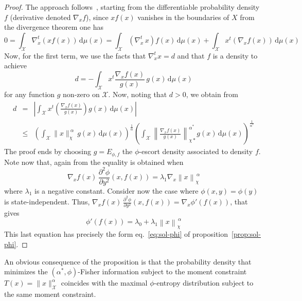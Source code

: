 \documentclass[entropy,article,submit,moreauthors,pdftex]{Definitions/mdpi}
\newcommand{\SZ}[1]{{\color{blue} #1}}                                       %
\def\dmu{\mathrm{d}\mu}%
\def\X{\mathcal{X}}%
\begin{document}
\begin{proof}
  The   approach   follows~\cite{Ber13},   starting  from   the   differentiable
  probability  density $f$  (derivative denoted  $\nabla_x f$),  since $x  f(x)$
  vanishes in the boundaries of $X$ from the divergence theorem one has
  \[
  0  = \int_\X  \nabla_x^t \left(  x f(x)  \right) \,  \dmu(x) =  \int_\X \left(
  \nabla_x^t \,  x \right) f(x)  \, \dmu(x) +  \int_\X x^t \left(  \nabla_x f(x)
  \right) \, \dmu(x)
  \]
  Now, for  the first term, we  use the facts  that \SZ{$\nabla_x^t x =  d$} and
  that $f$ is a density to achieve
  \[
  d = - \int_\X x^t \frac{\nabla_x f(x)}{g(x)} \, g(x) \, \dmu(x)
  \]
  for any function  $g$ non-zero on $\X$.   Now, noting that $d >  0$, we obtain
  from \cite[Lemma~2]{Ber13}
  \begin{eqnarray*}
  d  & = & \left|  \int_\X x^t  \left(  \frac{\nabla_x f(x)}{g(x)}  \right) g(x)  \,
  \dmu(x) \right|
  \\[2.5mm]
  & \le &  \left( \int_\X \|x\|_\chi^{\: \alpha} \,  g(x) \, \dmu(x)
  \right)^{\frac{1}{\alpha}}     \left(    \int_\X     \left\|    \frac{\nabla_x
    f(x)}{g(x)}\right\|_{\chi*}^{\alpha^*}        g(x)         \,        \dmu(x)
  \right)^{\frac{1}{\alpha^*}}
  \end{eqnarray*}
  The  proof  ends  by  choosing  $g =  E_{\phi,f}$  the  $\phi$-escort  density
  associated to density $f$. Note now that, again from \cite[Lemma~2]{Ber13} the
  equality is obtained when
  \[
  \nabla_x  f(x) \,  \frac{\partial^2 \phi}{\partial  y^2} (x,f(x))  = \lambda_1
  \nabla_x \left\| x \right\|_\chi^{\, \alpha}
  \]
  where  $\lambda_1$  is a  negative  constant.   Consider  now the  case  where
  $\phi(x,y)  =   \phi(y)$  is  state-independent.   Thus,   $\nabla_x  f(x)  \,
  \frac{\partial^2 \phi}{\partial  y^2} (x,f(x))  = \nabla_x  \phi'(f(x))$, that
  gives
  \[
  \phi'(f(x)) = \lambda_0 + \lambda_1 \left\| x \right\|_\chi^{\, \alpha}
  \]
  This  last   equation  has   precisely  the  form   eq.~\eqref{eq:sol-phi}  of
  proposition~\ref{prop:sol-phi}.
\end{proof}
%
An obvious  consequence of the proposition  is that the probability  density that
minimizes  the  $(\alpha^*,\phi)$-Fisher  information   subject  to  the  moment
constraint $T(x)  = \|x\|_\X^\alpha$  coincides with the  maximal $\phi$-entropy
distribution subject to the same moment constraint.
\end{document}
